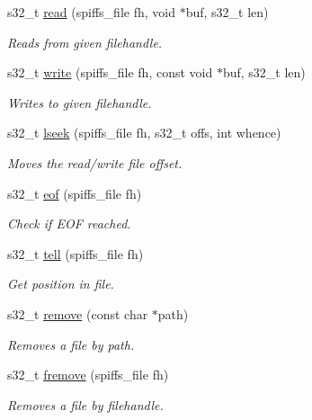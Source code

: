 \begin{DoxyCompactItemize}
s32\+\_\+t \mbox{\hyperlink{class_spiffs_particle_a39cfb5a9c5bc2ae9f99a3c5c3bf4e64f}{read}} (spiffs\+\_\+file fh, void $\ast$buf, s32\+\_\+t len)
\begin{DoxyCompactList}\small\item\em Reads from given filehandle. \end{DoxyCompactList}\item 
s32\+\_\+t \mbox{\hyperlink{class_spiffs_particle_a24c19c610c1bc97647d8797ed632a814}{write}} (spiffs\+\_\+file fh, const void $\ast$buf, s32\+\_\+t len)
\begin{DoxyCompactList}\small\item\em Writes to given filehandle. \end{DoxyCompactList}\item 
s32\+\_\+t \mbox{\hyperlink{class_spiffs_particle_a8875ae5bd2177da2b046ac5b6254ec85}{lseek}} (spiffs\+\_\+file fh, s32\+\_\+t offs, int whence)
\begin{DoxyCompactList}\small\item\em Moves the read/write file offset. \end{DoxyCompactList}\item 
s32\+\_\+t \mbox{\hyperlink{class_spiffs_particle_abb6a31d8bb30bbe0816e89f8d15cfd9c}{eof}} (spiffs\+\_\+file fh)
\begin{DoxyCompactList}\small\item\em Check if E\+OF reached. \end{DoxyCompactList}\item 
s32\+\_\+t \mbox{\hyperlink{class_spiffs_particle_a38ddf851ffd2e4ade100114bfe4ca524}{tell}} (spiffs\+\_\+file fh)
\begin{DoxyCompactList}\small\item\em Get position in file. \end{DoxyCompactList}\item 
s32\+\_\+t \mbox{\hyperlink{class_spiffs_particle_a9ee304e19b76f4a68e8f772a92bbd104}{remove}} (const char $\ast$path)
\begin{DoxyCompactList}\small\item\em Removes a file by path. \end{DoxyCompactList}\item 
s32\+\_\+t \mbox{\hyperlink{class_spiffs_particle_a19073c6608c352f93e4a5cff6bb95fb8}{fremove}} (spiffs\+\_\+file fh)
\begin{DoxyCompactList}\small\item\em Removes a file by filehandle. \end{DoxyCompactList}\item 

\end{DoxyCompactItemize}
